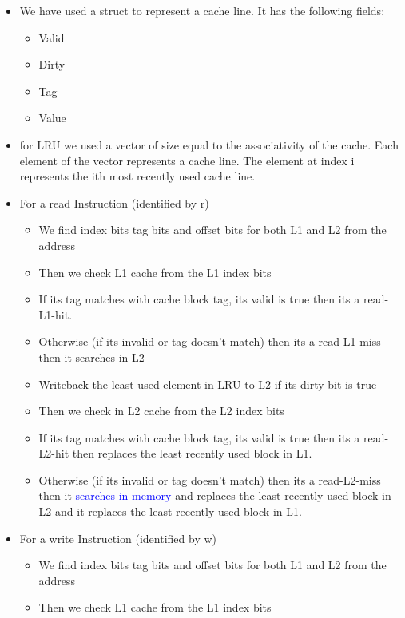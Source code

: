 \documentclass{article}
\begin{document}
\begin{itemize}
    \item We have used a struct to represent a cache line. It has the following fields:
    \begin{itemize}
        \item Valid 
        \item Dirty 
        \item Tag 
        \item Value
    \end{itemize}
    \item for LRU we used a vector of size equal to the associativity of the cache. Each element of the vector represents a cache line. The element at index i represents the ith most recently used cache line. 
    \item For a read Instruction (identified by r) 
    \begin{itemize}
        \item We find index bits tag bits  and offset bits for both L1 and L2 from the address
        \item Then we check L1 cache from the L1 index bits
        \item If its tag matches with cache block tag, its valid is true then its a read-L1-hit.
        \item Otherwise (if its invalid or tag doesn't match) then its a read-L1-miss then it searches in L2
        \item Writeback the least used element in LRU to L2 if its dirty bit is true
        \item Then we check in L2 cache from the L2 index bits
        \item If its tag matches with cache block tag, its valid is true then its a read-L2-hit then replaces the least recently used block in L1. 
        \item Otherwise (if its invalid or tag doesn't match) then its a read-L2-miss then it \textcolor{blue}{searches in memory} and replaces the least recently used block in L2  and it  replaces the least recently used block in L1. 
    \end{itemize}
    \item For a write Instruction (identified by w)
    \begin{itemize}
        \item We find index bits tag bits  and offset bits for both L1 and L2 from the address
        \item Then we check L1 cache from the L1 index bits

\end{itemize}
\end{itemize}
\end{document}
